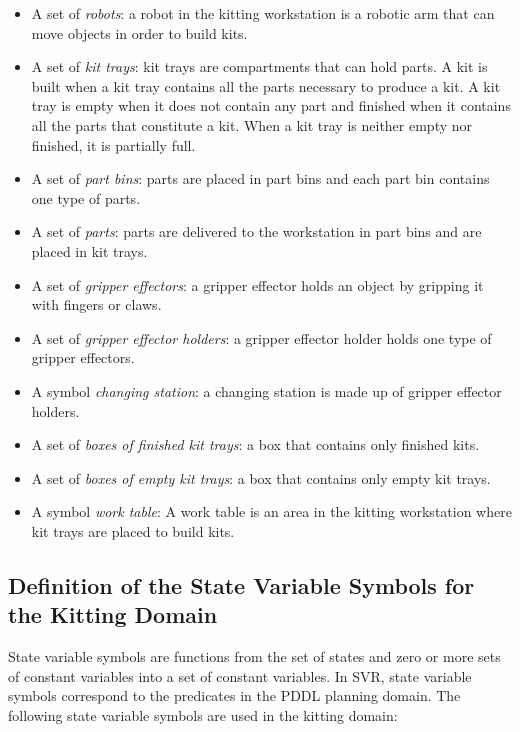 \begin{itemize}
\item A set of \emph{robots}: a robot in the kitting workstation is a robotic arm that can move objects in order to build kits.

\item A set of \emph{kit trays}: kit trays are compartments that can hold parts. A kit is built when a kit tray contains all the parts necessary to produce a kit. A kit tray is empty when it does not contain any part and finished when it contains all the parts that constitute a kit. When a kit tray is neither empty nor finished, it is partially full.

\item A set of \emph{part bins}: parts are placed in part bins and each part bin contains one type of parts.

\item A set of \emph{parts}: parts are delivered to the workstation in part bins and are placed in kit trays.

\item A set of \emph{gripper effectors}: a gripper effector holds an object by gripping it with
fingers or claws.

\item A set of \emph{gripper effector holders}: a gripper effector holder holds one type of gripper effectors.

\item A symbol \emph{changing station}: a changing station is made up of gripper effector holders.

\item A set of \emph{boxes of finished kit trays}: a box that contains only finished kits.

\item A set of \emph{boxes of empty kit trays}: a box that contains only empty kit trays.

\item A symbol \emph{work table}: A work table is an area in the kitting workstation where kit trays are placed to build kits.
\end{itemize} 

\subsection{Definition of the State Variable Symbols for the Kitting Domain}
State variable symbols are functions from the set of states and zero or more sets of constant variables into a set of constant variables. In SVR, state variable symbols correspond to the predicates in the PDDL planning domain. The following state variable symbols are used in the kitting domain: 